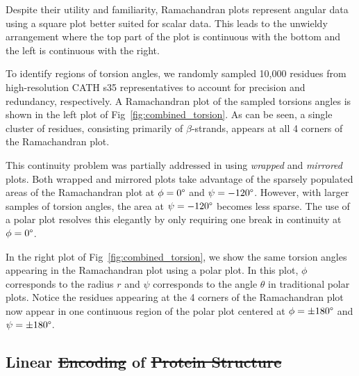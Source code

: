 \documentclass[10pt,letterpaper]{article}
\renewcommand{\figurename}{Fig}
\providecommand{\DIFaddtex}[1]{{\protect\color{blue}\uwave{#1}}} %
\providecommand{\DIFdeltex}[1]{{\protect\color{red}\sout{#1}}}                      %
\providecommand{\DIFaddbegin}{} %
\providecommand{\DIFaddend}{} %
\providecommand{\DIFdelbegin}{} %
\providecommand{\DIFdelend}{} %
\providecommand{\DIFadd}[1]{\texorpdfstring{\DIFaddtex{#1}}{#1}} %
\providecommand{\DIFdel}[1]{\texorpdfstring{\DIFdeltex{#1}}{}} %
\newcommand{\DIFscaledelfig}{0.5}
\newlength{\DIFdelgraphicswidth} %
\newlength{\DIFdelgraphicsheight} %
\newcommand{\DIFaddincludegraphics}[2][]{{\color{blue}\fbox{\DIFOincludegraphics[#1]{#2}}}} %
\newcommand{\DIFdelincludegraphics}[2][]{%
\sbox{\DIFdelgraphicsbox}{\DIFOincludegraphics[#1]{#2}}%
\settoboxwidth{\DIFdelgraphicswidth}{\DIFdelgraphicsbox} %
\settoboxtotalheight{\DIFdelgraphicsheight}{\DIFdelgraphicsbox} %
\scalebox{\DIFscaledelfig}{%
\parbox[b]{\DIFdelgraphicswidth}{\usebox{\DIFdelgraphicsbox}\\[-\baselineskip] \rule{\DIFdelgraphicswidth}{0em}}\llap{\resizebox{\DIFdelgraphicswidth}{\DIFdelgraphicsheight}{%
\setlength{\unitlength}{\DIFdelgraphicswidth}%
\begin{picture}(1,1)%
\thicklines\linethickness{2pt} %
{\color[rgb]{1,0,0}\put(0,0){\framebox(1,1){}}}%
{\color[rgb]{1,0,0}\put(0,0){\line( 1,1){1}}}%
{\color[rgb]{1,0,0}\put(0,1){\line(1,-1){1}}}%
\end{picture}%
}\hspace*{3pt}}} %
} %
\DeclareRobustCommand{\DIFaddbegin}{\DIFOaddbegin \let\includegraphics\DIFaddincludegraphics} %
\DeclareRobustCommand{\DIFaddend}{\DIFOaddend \let\includegraphics\DIFOincludegraphics} %
\DeclareRobustCommand{\DIFdelbegin}{\DIFOdelbegin \let\includegraphics\DIFdelincludegraphics} %
\DeclareRobustCommand{\DIFdelend}{\DIFOaddend \let\includegraphics\DIFOincludegraphics} %
\begin{document}
Despite their utility and familiarity, Ramachandran plots \cite{Ramachandran1968} represent angular data using a square plot better suited for scalar data.
This leads to the unwieldy arrangement where the top part of the plot is continuous with the bottom and the left is continuous with the right. 

To identify regions of torsion angles, we randomly sampled 10,000 residues from high-resolution CATH s35 representatives to account for precision and redundancy, respectively. 
A Ramachandran plot of the sampled torsions angles is shown in the left plot of \figurename~\ref{fig:combined_torsion}. 
As can be seen, a single cluster of residues, consisting primarily of $\beta$-strands, appears at all 4 corners of the Ramachandran plot.

\begin{figure*}[!h]
\caption{Ramachandran plot (right) and polar plot (left) of randomly sampled torsion angles}
\label{fig:combined_torsion}
\end{figure*}

This continuity problem was partially addressed in \cite{Karplus2010} using \emph{wrapped} and \emph{mirrored} plots. 
Both wrapped and mirrored plots take advantage of the sparsely populated areas of the Ramachandran plot at $\phi = 0\degree$ and $\psi = -120\degree$.
However, with larger samples of torsion angles, the area at $\psi = -120\degree$ becomes less sparse. 
The use of a polar plot resolves this elegantly by only requiring one break in continuity at $\phi = 0\degree$. 

In the right plot of \figurename~\ref{fig:combined_torsion}, we show the same torsion angles appearing in the Ramachandran plot using a polar plot. 
In this plot, $\phi$ corresponds to the radius $r$ and $\psi$ corresponds to the angle $\theta$ in traditional polar plots. 
Notice the residues appearing at the 4 corners of the Ramachandran plot now appear in one continuous region of the polar plot centered at $\phi = \pm180\degree$ and $\psi = \pm180\degree$. 

\subsection*{Linear \DIFdelbegin \DIFdel{Encoding }\DIFdelend \DIFaddbegin \DIFadd{encoding }\DIFaddend of \DIFdelbegin \DIFdel{Protein Structure}\DIFdelend \DIFaddbegin \DIFadd{protein structure}\DIFaddend }
\end{document}
